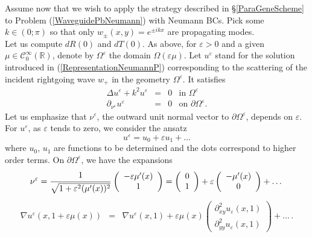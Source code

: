 \documentclass[11pt,a4paper]{report}
\newcommand{\eps}{\varepsilon}
\newcommand{\Om}{\Omega}
\newcommand{\R}{\mathbb{R}}
\begin{document}
Assume now that we wish to apply the strategy described in \S\ref{ParaGeneScheme} to Problem (\ref{WaveguidePbNeumann}) with Neumann BCs. Pick some $k\in(0;\pi)$ so that only $w_\pm(x,y)=e^{\pm ikx}$ are propagating modes. \\
\newline
Let us compute $dR(0)$ and $dT(0)$. As above, for $\eps>0$ and a given $\mu\in\mathscr{C}^\infty_0(\R)$, denote by $\Om^\eps$ the domain $\Om(\eps\mu)$. Let $u^\eps$ stand for the solution introduced in (\ref{RepresentationNeumannP}) corresponding to the scattering of the incident rightgoing wave $w_+$ in the geometry $\Om^\eps$. It satisfies  
\begin{equation} \label{fortEps} 
\begin{array}{|rccl}
\Delta u^\eps + k^2u^\eps &=& 0&  \mbox{in }\Om^\eps\\[3pt]
\partial_{\nu^\eps} u^\eps&=&0 & \mbox{on } \partial\Om^\eps.
\end{array}	
\end{equation}
Let us emphasize that $\nu^\eps$, the outward unit normal vector to $\partial\Om^\eps$, depends on $\eps$. For $u^\eps$, as $\eps$ tends to zero, we consider the ansatz 
\begin{equation}\label{ExpansionN}
u^{\eps}=u_0+\eps u_1+\dots
\end{equation}
where $u_0$, $u_1$ are functions to be determined and the dots correspond to higher order terms. On $\partial\Om^\eps$, we have the expansions
\begin{equation}\label{ExpansionNormal}
\nu^\eps = \cfrac{1}{\sqrt{1+\eps^2(\mu'(x))^2}}\,\left( \begin{array}{c}
-\eps \mu'(x)\\
1
\end{array}
\right)=\left( \begin{array}{c}
0\\
1
\end{array}
\right)+\eps\left( \begin{array}{c}
-\mu'(x)\\
0
\end{array}
\right)+\dots
\end{equation}
\begin{equation}\label{TaylorExpansion}
\begin{array}{rcl}
\nabla u^\eps(x,1+\eps \mu(x))&=&\nabla u^\eps(x,1)+\eps \mu(x)\left( \begin{array}{c}
\partial^2_{xy}u_\eps(x,1)\\[2pt]
\partial^2_{yy}u_\eps(x,1)
\end{array}
\right)+\dots\,.
\end{array}
\end{equation}
\end{document}

